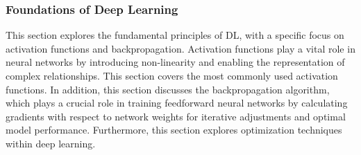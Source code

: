 \subsubsection{Foundations of Deep Learning} \label{sec:dl-foundations}

This section explores the fundamental principles of \ac{DL}, with a specific focus on activation functions and backpropagation. Activation functions play a vital role in neural networks by introducing non-linearity and enabling the representation of complex relationships. This section covers the most commonly used activation functions. In addition, this section discusses the backpropagation algorithm, which plays a crucial role in training feedforward neural networks by calculating gradients with respect to network weights for iterative adjustments and optimal model performance. Furthermore, this section explores optimization techniques within deep learning.




